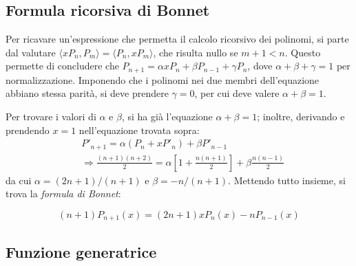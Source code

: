 \documentclass[11pt, a4paper]{scrartcl}
\theoremstyle{definition}
\numberwithin{esempio}{section}
\theoremstyle{definition}
\numberwithin{obs}{section}
\numberwithin{nota}{section}
\newenvironment{boxenv}[1][]{
    \begin{eqbox}[#1]
    }{
   \end{eqbox}
}
\numberwithin{equation}{subsection}
\begin{document}
\subsection{Formula ricorsiva di Bonnet}
Per ricavare un'espressione che permetta il calcolo ricorsivo dei polinomi, si parte dal valutare $\langle xP_n,P_m \rangle = \langle P_n,xP_m \rangle$, che risulta nullo se $m+1 < n$.
Questo permette di concludere che $P_{n+1}=\alpha xP_n + \beta P_{n-1} + \gamma P_n $, dove $\alpha  + \beta  + \gamma = 1$ per normalizzazione.
Imponendo che i polinomi nei due membri dell'equazione abbiano stessa parit\`a, si deve prendere $\gamma=0$, per cui deve valere $\alpha  + \beta  = 1$.

Per trovare i valori di $\alpha $ e $\beta $, si ha gi\`a l'equazione $\alpha  + \beta  = 1$; inoltre, derivando e prendendo $x=1 $ nell'equazione trovata sopra:
\[
\begin{split}
	&P'_{n+1}  = \alpha (P_n + x P'_n) + \beta P'_{n-1} \\
	&\Rightarrow \frac{(n+1)(n+2)}{2} = \alpha \left[ 1 + \frac{n(n+1)}{2} \right] + \beta \frac{n(n-1)}{2}
\end{split}
\] 
da cui $\alpha = (2n+1) / (n+1)$ e $\beta = - n / (n+1)$.
Mettendo tutto insieme, si trova la \textit{formula di Bonnet}:
\begin{boxenv}[]
\begin{equation}
	(n+1) P_{n+1} (x) = (2n+1) x P_n(x) - n P_{n-1} (x)
\end{equation}
\end{boxenv}
\subsection{Funzione generatrice}
\end{document}
